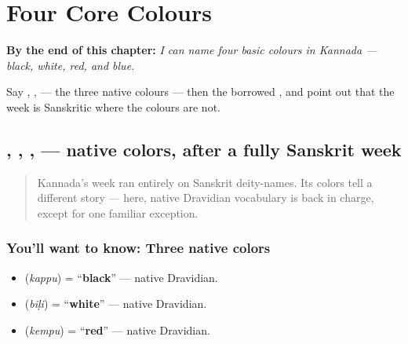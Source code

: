 
\chapter{Four Core Colours}
\label{ch:ka-core-colours}

\begin{chapteropening}
\textbf{By the end of this chapter:} \emph{I can name four basic colours in Kannada — black, white, red, and blue.}

Say , ,  — the three native colours — then the borrowed , and point out that the week is Sanskritic where the colours are not.
\end{chapteropening}

\section[\texorpdfstring{\kn{ಕಪ್ಪು} \kn{ಬಿಳಿ} \kn{ಕೆಂಪು} \kn{ನೀಲಿ} (kappu biḷi kempu nīli)}{ಕಪ್ಪು ಬಿಳಿ ಕೆಂಪು ನೀಲಿ (kappu biḷi kempu nīli)}]{, , ,  — native colors, after a fully Sanskrit week}

\label{lesson:KA-C11-bannagalu}



\begin{quote}
Kannada's week ran entirely on Sanskrit deity-names. Its colors tell a different story — here, native Dravidian vocabulary is back in charge, except for one familiar exception.
\end{quote}

\subsection*{You'll want to know: Three native colors}
\begin{itemize}
\raggedright
  \item \textbf{} (\emph{kappu}) = \textquotedblleft{}\textbf{black}\textquotedblright{} — native Dravidian.
  \item \textbf{} (\emph{biḷi}) = \textquotedblleft{}\textbf{white}\textquotedblright{} — native Dravidian.
  \item \textbf{} (\emph{kempu}) = \textquotedblleft{}\textbf{red}\textquotedblright{} — native Dravidian.
\end{itemize}

